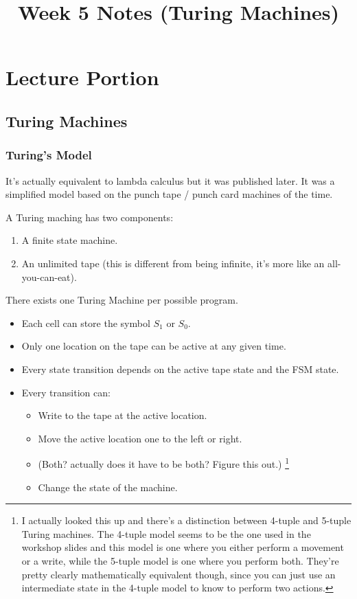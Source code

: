 \documentclass{article}
\title{Week 5 Notes (Turing Machines)}
\begin{document}
\maketitle
\tableofcontents

\section{Lecture Portion}

\subsection{Turing Machines}
\subsubsection{Turing's Model}
It's actually equivalent to lambda calculus but it was published later.
It was a simplified model based on the punch tape / punch card machines of the time.

A Turing maching has two components:
\begin{enumerate}
	\item A finite state machine.
	\item An unlimited tape (this is different from being infinite, it's more like an all-you-can-eat).
\end{enumerate}

There exists one Turing Machine per possible program.

\begin{itemize}
	\item Each cell can store the symbol $S_1$ or $S_0$.
	\item Only one location on the tape can be active at any given time.
	\item Every state transition depends on the active tape state
		and the FSM state.
	\item Every transition can:
		\begin{itemize}
			\item Write to the tape at the active location.
			\item Move the active location one to the left or right.
			\item (Both? actually does it have to be both? Figure this out.)
				\footnote{
					I actually looked this up and there's a distinction between 4-tuple
					and 5-tuple Turing machines. The 4-tuple model seems to be the one
					used in the workshop slides and this model is one where you either
					perform a movement or a write, while the 5-tuple model is one where
					you perform both.
					They're pretty clearly mathematically equivalent though, since you
					can just use an intermediate state in the 4-tuple model to know to
					perform two actions.
				}
			\item Change the state of the machine.
		\end{itemize}
\end{itemize}
\end{document}
